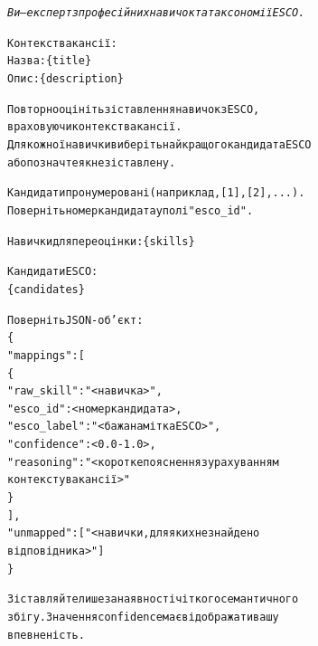 \documentclass[11pt]{article}
\begin{document}
\begin{small}
\begin{alltt}\selectfont\itshape
Ви — експерт з професійних навичок та таксономії ESCO.

Контекст вакансії:
Назва: \{title\}
Опис: \{description\}

Повторно оцініть зіставлення навичок з ESCO,
враховуючи контекст вакансії.
Для кожної навички виберіть найкращого кандидата ESCO
або позначте як незіставлену.

Кандидати пронумеровані (наприклад, [1], [2], ...).
Поверніть номер кандидата у полі "esco\_id".

Навички для переоцінки: \{skills\}

Кандидати ESCO:
\{candidates\}

Поверніть JSON-об'єкт:
\{
  "mappings": [
    \{
      "raw\_skill": "<навичка>",
      "esco\_id": <номер кандидата>,
      "esco\_label": "<бажана мітка ESCO>",
      "confidence": <0.0-1.0>,
      "reasoning": "<коротке пояснення з урахуванням
                     контексту вакансії>"
    \}
  ],
  "unmapped": ["<навички, для яких не знайдено
                 відповідника>"]
\}

Зіставляйте лише за наявності чіткого семантичного
збігу. Значення confidence має відображати вашу
впевненість.
\end{alltt}
\end{small}
\end{document}
